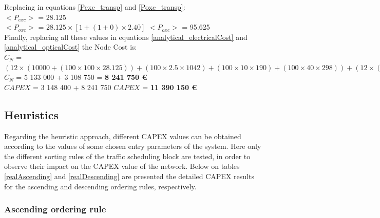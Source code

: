 Replacing in equations \ref{Pexc_transp} and \ref{Poxc_transp}:\\

$<P_{exc}>$ = 28.125\\

$<P_{oxc}>$ = $28.125 \times [1 + (1 + 0 ) \times 2.40]$ \qquad \quad $<P_{oxc}>$ = 95.625 \\

Finally, replacing all these values in equations \ref{analytical_electricalCost} and \ref{analytical_opticalCost} the Node Cost is:\\


$C_N$ = $(12 \times (10 000 + (100 \times 100 \times 28.125)) + (100 \times 2.5 \times 1042) + (100 \times 10 \times 190) + (100 \times 40 \times 298)) + (12 \times (20 000 + (2 500 \times 95.625 )))$\\

$C_N$ = 5 133 000 + 3 108 750 = \textbf{8 241 750 \euro}\\

$CAPEX$ = 3 148 400 + 8 241 750 \qquad \qquad $CAPEX$ = \textbf{11 390 150 \euro}\\

\subsection{Heuristics}

Regarding the heuristic approach, different CAPEX values can be obtained according to the values of some chosen entry parameters of the system. Here only the different sorting rules of the traffic scheduling block are tested, in order to observe their impact on the CAPEX value of the network. Below on tables \ref{realAscending} and  \ref{realDescending} are presented the detailed CAPEX results for the ascending and descending ordering rules, respectively.%


\subsubsection{Ascending ordering rule}


